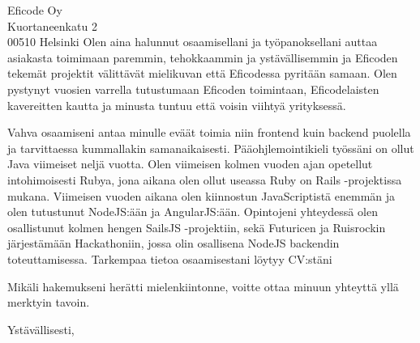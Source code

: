 \documentclass{letter} %
\begin{document}
\begin{letter}{%
 Eficode Oy \\
Kuortaneenkatu 2 \\
00510 Helsinki
}
Olen aina halunnut osaamisellani ja työpanoksellani auttaa asiakasta toimimaan paremmin, tehokkaammin ja ystävällisemmin ja Eficoden tekemät projektit välittävät mielikuvan että Eficodessa pyritään samaan. Olen pystynyt vuosien varrella tutustumaan Eficoden toimintaan, Eficodelaisten kavereitten kautta ja minusta tuntuu että voisin viihtyä yrityksessä.

\noindent
Vahva osaamiseni antaa minulle eväät toimia niin frontend kuin backend puolella ja tarvittaessa kummallakin samanaikaisesti.
Pääohjlemointikieli työssäni on ollut Java viimeiset neljä vuotta. Olen viimeisen kolmen vuoden ajan opetellut intohimoisesti Rubya, jona aikana olen ollut useassa Ruby on Rails -projektissa mukana. Viimeisen vuoden aikana olen kiinnostun JavaScriptistä enemmän ja olen tutustunut NodeJS:ään ja AngularJS:ään. Opintojeni yhteydessä olen osallistunut kolmen hengen SailsJS -projektiin, sekä Futuricen ja Ruisrockin järjestämään Hackathoniin, jossa olin osallisena NodeJS backendin toteuttamisessa. Tarkempaa tietoa osaamisestani löytyy CV:stäni


Mikäli hakemukseni herätti mielenkiintonne, voitte ottaa minuun yhteyttä yllä merktyin tavoin.




\closing{Ystävällisesti,}




\end{letter}
\end{document}
